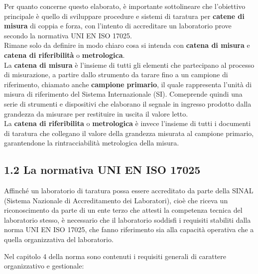 \documentclass[a4paper, twoside]{article}
\begin{document}
Per quanto concerne questo elaborato, è importante sottolineare che l'obiettivo principale è quello di sviluppare procedure e sistemi di taratura per \textbf{catene di misura} di coppia e forza, con l'intento di accreditare un laboratorio prove secondo la normativa UNI EN ISO 17025.\\
Rimane solo da definire in modo chiaro cosa si intenda con \textbf{catena di misura} e \textbf{catena di riferibilità} o \textbf{metrologica}.\\
 La \textbf{catena di misura} è l'insieme di tutti gli elementi che partecipano al processo di misurazione, a partire dallo strumento da tarare fino a un campione di riferimento, chiamato anche \textbf{campione primario}, il quale rappresenta l'unità di misura di riferimento del Sistema Internazionale (SI). Comeprende quindi una serie di strumenti e dispositivi che elaborano il segnale in ingresso prodotto dalla grandezza da misurare per restituire in uscita il valore letto.\\
La \textbf{catena di riferibilita} o \textbf{metrologica} è invece l'insieme di tutti i documenti di taratura che collegano il valore della grandezza misurata al campione primario, garantendone la rintracciabilità metrologica della misura.\par


\subsection{1.2	La normativa UNI EN ISO 17025}

Affinché un laboratorio di taratura possa essere accreditato da parte della SINAL (Sistema Nazionale di Accreditamento dei Laboratori), cioè che riceva un riconoscimento da parte di un ente terzo che attesti la competenza tecnica del laboratorio stesso, è necessario che il laboratorio soddisfi i requisiti stabiliti dalla norma UNI EN ISO 17025, che fanno riferimento sia alla capacità operativa che a quella organizzativa del laboratorio.\par

Nel capitolo 4 della norma sono contenuti i requisiti generali di carattere organizzativo e gestionale:
\end{document}
